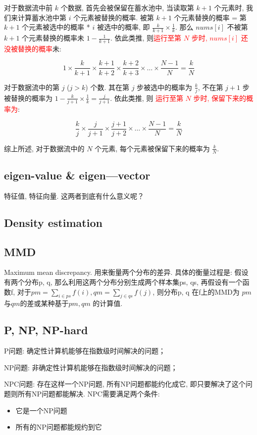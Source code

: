 对于数据流中前 $k$ 个数据, 首先会被保留在蓄水池中, 当读取第 $k+1$ 个元素时, 我们来计算蓄水池中第 $i$ 个元素被替换的概率. 被第 $k+1$ 个元素替换的概率 = 第 $k+1$ 个元素被选中的概率 * $i$ 被选中的概率, 即 $\frac{k}{k+1} \times \frac{1}{k}$. 那么 $nums[i]$ 不被第 $k+1$ 个元素替换的概率未 $1 - \frac{1}{k+1}$. 依此类推, 则\textcolor{red}{运行至第 $N$ 步时, $nums[i]$ 还没被替换的概率}未:

$$
1 \times \frac{k}{k+1} \times \frac{k+1}{k+2} \times \frac{k+2}{k+3} \times \dots \times \frac{N-1}{N} = \frac{k}{N}
$$

对于数据流中的第 $j$ ($j > k$) 个数. 其在第 $j$ 步被选中的概率为 $\frac{k}{j}$, 不在第 $j+1$ 步被替换的概率为 $1 - \frac{k}{j+1} \times \frac{1}{k} = \frac{j}{j+1}$. 依此类推, 则 \textcolor{red}{运行至第 $N$ 步时, 保留下来的概率为}:

$$
\frac{k}{j} \times \frac{j}{j+1} \times \frac{j+1}{j+2} \times \dots \times \frac{N-1}{N} = \frac{k}{N}
$$

综上所述, 对于数据流中的 $N$ 个元素, 每个元素被保留下来的概率为 $\frac{k}{N}$.


\subsection{eigen-value \& eigen—vector }
特征值, 特征向量. 
这两者到底有什么意义呢？


\subsection{Density estimation }

\subsection{MMD}
Maximum mean discrepancy.  用来衡量两个分布的差异. 具体的衡量过程是: 
假设有两个分布p, q, 那么利用这两个分布分别生成两个样本集ps, qs, 再假设有一个函数f, 对于$pm = \sum_{i \in ps}f(i), qm = \sum_{j \in qs}f(j) $,
则分布p, q 在f上的MMD为 $pm$与$qm$的差或某种基于$pm, qm$ 的计算值. 

\subsection{P, NP, NP-hard}
P问题: 确定性计算机能够在指数级时间解决的问题；

NP问题: 非确定性计算机能够在指数级时间解决的问题；

NPC问题: 存在这样一个NP问题, 所有NP问题都能约化成它, 即只要解决了这个问题则所有NP问题都能解决. NPC需要满足两个条件: 
\begin{itemize}
	\item 它是一个NP问题
	\item 所有的NP问题都能规约到它
\end{itemize}

